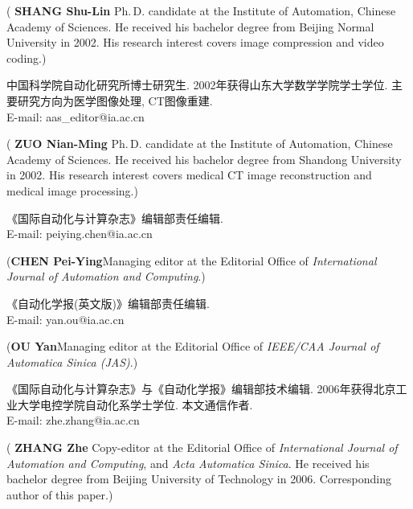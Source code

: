 \documentclass{Style/aas}
\begin{document}
\begin{multicols}{2}
\begin{biography}
\noindent({\bf
SHANG Shu-Lin
}\quad
Ph.\,D. candidate at the
Institute of Automation, Chinese Academy of Sciences. He received
his bachelor degree from Beijing Normal University in 2002. His research
interest covers image compression and video coding.)
\end{biography}

\begin{biography}
\quad
中国科学院自动化研究所博士研究生.
2002年获得山东大学数学学院学士学位.
主要研究方向为医学图像处理, CT图像重建.\\E-mail: aas\_editor@ia.ac.cn

\noindent({\bf
ZUO Nian-Ming
}\quad
Ph.\,D. candidate at the
Institute of Automation, Chinese Academy of Sciences. He received
his bachelor degree from Shandong University in 2002. His research
interest covers medical CT image reconstruction and medical image
processing.)
\end{biography}

\begin{biographynophoto}
\quad 《国际自动化与计算杂志》编辑部责任编辑.\\E-mail: peiying.chen@ia.ac.cn

\noindent({\bf CHEN Pei-Ying}\quad Managing editor at the Editorial Office of
{\sl International Journal of Automation and Computing}.)
\end{biographynophoto}

\begin{biographynophoto}
\quad 《自动化学报(英文版)》编辑部责任编辑.\\E-mail: yan.ou@ia.ac.cn

\noindent({\bf OU Yan}\quad Managing editor at the Editorial Office of
{\sl IEEE/CAA Journal of Automatica Sinica (JAS)}.)
\end{biographynophoto}

\begin{biography}
\quad
《国际自动化与计算杂志》与《自动化学报》编辑部技术编辑. 2006年获得北京工业大学电控学院自动化系学士学位.
本文通信作者.\\E-mail: zhe.zhang@ia.ac.cn

\noindent({\bf
ZHANG Zhe
}\quad
Copy-editor at the Editorial Office of
{\sl International Journal of Automation and Computing}, and {\sl
Acta Automatica Sinica}. He received his bachelor degree from Beijing
University of Technology in 2006. Corresponding author of this paper.)
\end{biography}
\end{multicols}
\end{document}
